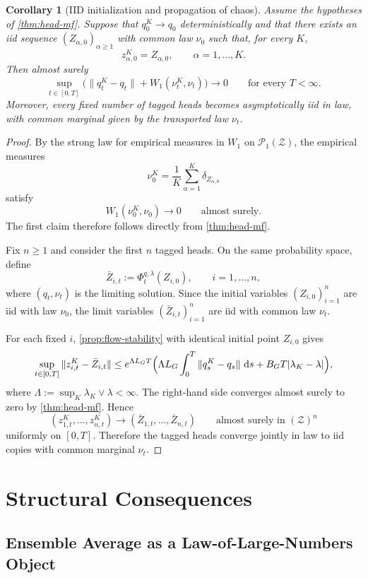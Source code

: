 \documentclass{article}
\newtheorem{corollary}[theorem]{Corollary}
\theoremstyle{definition}
\newcommand{\PP}{\mathcal{P}}
\newcommand{\W}{W_1}
\newcommand{\dd}{\,\mathrm{d}}
\begin{document}
\begin{corollary}[IID initialization and propagation of chaos]
\label{cor:poc}
Assume the hypotheses of \cref{thm:head-mf}. Suppose that $q_0^K\to q_0$ deterministically and that there exists an iid sequence $(Z_{\alpha,0})_{\alpha\ge 1}$ with common law $\nu_0$ such that, for every $K$,
\[
  z_{\alpha,0}^K=Z_{\alpha,0},
  \qquad
  \alpha=1,\dots,K.
\]
Then almost surely
\[
  \sup_{t\in[0,T]}
  \bigl(
    \|q_t^K-q_t\|+\W(\nu_t^K,\nu_t)
  \bigr)\to 0
  \qquad
  \text{for every }T<\infty.
\]
Moreover, every fixed number of tagged heads becomes asymptotically iid in law, with common marginal given by the transported law $\nu_t$.
\end{corollary}

\begin{proof}
By the strong law for empirical measures in $\W$ on $\PP_1(\mathcal Z)$, the empirical measures
\[
  \nu_0^K=\frac1K\sum_{\alpha=1}^K \delta_{Z_{\alpha,0}}
\]
satisfy
\[
  \W(\nu_0^K,\nu_0)\to 0
  \qquad
  \text{almost surely.}
\]
The first claim therefore follows directly from \cref{thm:head-mf}.

Fix $n\ge 1$ and consider the first $n$ tagged heads. On the same probability space, define
\[
  \bar Z_{i,t}:=\Phi_t^{q,\lambda}(Z_{i,0}),
  \qquad
  i=1,\dots,n,
\]
where $(q_t,\nu_t)$ is the limiting solution. Since the initial variables $(Z_{i,0})_{i=1}^n$ are iid with law $\nu_0$, the limit variables $(\bar Z_{i,t})_{i=1}^n$ are iid with common law $\nu_t$.

For each fixed $i$, \cref{prop:flow-stability} with identical initial point $Z_{i,0}$ gives
\[
  \sup_{t\in[0,T]}
  \|z_{i,t}^K-\bar Z_{i,t}\|
  \le
  e^{\Lambda L_G T}
  \Bigl(
    \Lambda L_G \int_0^T \|q_s^K-q_s\|\,\dd s
    +
    B_G T|\lambda_K-\lambda|
  \Bigr),
\]
where $\Lambda:=\sup_K\lambda_K\vee\lambda<\infty$. The right-hand side converges almost surely to zero by \cref{thm:head-mf}. Hence
\[
  (z_{1,t}^K,\dots,z_{n,t}^K)
  \to
  (\bar Z_{1,t},\dots,\bar Z_{n,t})
  \qquad
  \text{almost surely in }(\mathcal Z)^n
\]
uniformly on $[0,T]$. Therefore the tagged heads converge jointly in law to iid copies with common marginal $\nu_t$.
\end{proof}

\section{Structural Consequences}
\label{sec:consequences}

\subsection{Ensemble Average as a Law-of-Large-Numbers Object}
\end{document}
